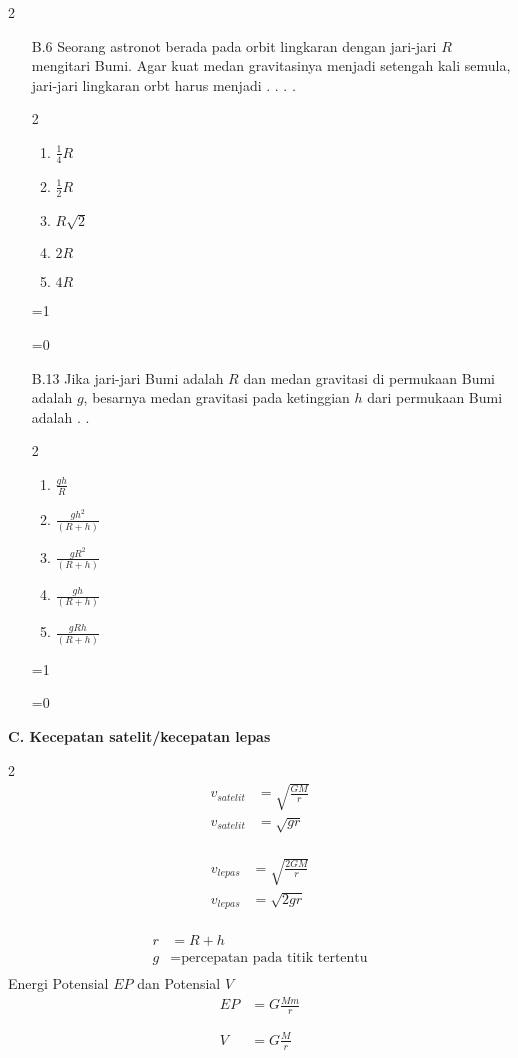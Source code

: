\documentclass[11pt,a4paper]{article}
\def\tampilkunci{1}
\newcommand{\hide}[1]{\ifnum\tampilkunci=1
%
\begin{mybox}
 #1
\end{mybox}
%
\vspace{\baselineskip}\fi\ifnum\tampilkunci=0
%
\vspace{2cm}
%
\fi}
\newcommand{\pilgani}[1]{                            \vspace{-0.3cm}\begin{multicols}{2}
 \begin{enumerate}[label=\Alph*., itemsep=0pt,topsep=0pt,leftmargin=*,align=Center]#1                     \end{enumerate}
 \phantom{ini cuma sapi, wedus, dan ayam}
 \end{multicols}}
\begin{document}
\begin{multicols*}{2}
\begin{enumerate}
{}




\item [B.6] Seorang astronot berada pada orbit lingkaran dengan jari-jari $R$ mengitari Bumi. Agar kuat medan gravitasinya menjadi setengah kali semula, jari-jari lingkaran orbt harus menjadi . . . .
\pilgani{
	\item $\frac{1}{4} R$
	\item $\frac{1}{2} R$
	\item $R\sqrt{2}$
	\item $2R$
	\item $4R$
	}
	
\hide{

}




\item [B.13] Jika jari-jari Bumi adalah $R$ dan medan gravitasi di permukaan Bumi adalah $g$, besarnya medan gravitasi pada ketinggian $h$ dari permukaan Bumi adalah . . 
\pilgani{
	\item $\frac{gh}{R}$
	\item $\frac{gh^2}{(R+h)} $
	\item $\frac{gR^2}{(R+h)}$
	\item $\frac{gh}{(R+h)}$
	\item $\frac{gRh}{(R+h)}$ }
\hide{

}


\end{enumerate}



\textbf{C. Kecepatan satelit/kecepatan lepas}
\begin{multicols}{2}
\vspace{-0.5cm}
\begin{align*}
v_{satelit} &= \sqrt{\frac{GM}{r}} \\
v_{satelit} &= \sqrt{gr}\\
\end{align*} 

\begin{align*}
v_{lepas} &= \sqrt{\frac{2GM}{r}} \\
v_{lepas} &= \sqrt{2gr}\\
\end{align*} 
\end{multicols}
\vspace{-1.7cm}\begin{align*}
r &= R+h\\
g &= \text{percepatan pada titik tertentu}\\
\end{align*}
Energi Potensial $EP$ dan Potensial $V$
\begin{align*}
EP &= G\frac{Mm}{r}\\
\phantom {s}\\
V &= G\frac{M}{r}\\
\end{align*}


\end{multicols*}
\end{document}

